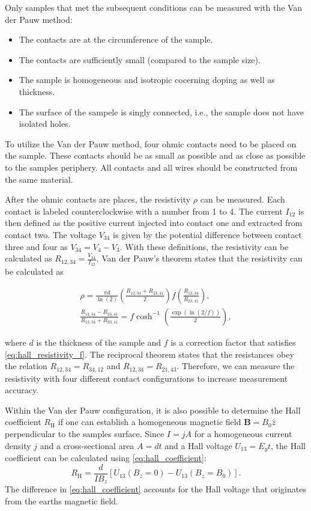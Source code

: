Only samples that met the subsequent conditions can be measured with the Van der Pauw method:
\begin{itemize}
	\item The contacts are at the circumference of the sample.
	\item The contacts are sufficiently small (compared to the sample size).
	\item The sample is homogeneous and isotropic cocerning doping as well as thickness.
	\item The surface of the sampele is singly connected, i.e., the sample does not have isolated holes.
\end{itemize}
To utilize the Van der Pauw method, four ohmic contacts need to be placed on the sample.
These contacts should be as small as possible and as close as possible to the samples periphery. 
All contacts and all wires should be constructed from the same material. 

After the ohmic contacts are places, the resistivity $\rho$ can be measured.
Each contact is labeled counterclockwise with a number from 1 to 4.
The current $I_{12}$ is then defined as the positive current injected into contact one and extracted from contact two.
The voltage $V_{34}$ is given by the potential difference between contact three and four as $V_{34}=V_4-V_3$. 
With these definitions, the resistivity can be calculated as $R_{12,34}=\frac{V_{34}}{I_{12}}$. 
Van der Pauw's theorem states that the resistivity can be calculated as 

\begin{align}
	\rho=\frac{\pi d}{\ln(2)} \left( \frac{R_{12,34}+R_{23,41}}{2} \right)f
	\left( \frac{R_{12,34}}{R_{23,41}} \right), \label{eq:hall_resistivity}\\
	\frac{R_{12,34}-R_{23,41}}{R_{12,34}+R_{23,41}}=f \cosh^{-1} \left( \frac{\exp(\ln(2 /f))}{2} \right),
	\label{eq:hall_resistivity_f}
\end{align}

where $d$ is the thickness of the sample and $f$ is a correction factor that satisfies \cref{eq:hall_resistivity_f}. 
The reciprocal theorem states that the resistances obey the relation $R_{12,34}=R_{34,12}$ and $R_{12,34}=R_{21,43}$.
Therefore, we can measure the resistivity with four different contact configurations to increase measurement accuracy.

Within the Van der Pauw configuration, it is also possible to determine the Hall coefficient $R_{\mathrm{H}}$ if 
one can establish a homogeneous magnetic field $\mathbf{B}=B_{0} \hat{z}$ perpendicular to the samples surface. 
Since $I= j A$ for a homogeneous current density $j$ and a cross-sectional area $A = d t$ and a Hall voltage $U_{13} = E_{y} t$,
the Hall coefficient can be calculated using \cref{eq:hall_coefficient}:
\begin{equation}
	R_{\mathrm{H}}=\frac{d}{IB_{z}} [U_{13}(B_{z}=0)-U_{13}(B_{z}=B_{0})].
	\label{eq:hall_coefficient_van_der_pauw}
\end{equation}
The difference in  \cref{eq:hall_coefficient} accounts for the Hall voltage that originates from the earths magnetic field.




